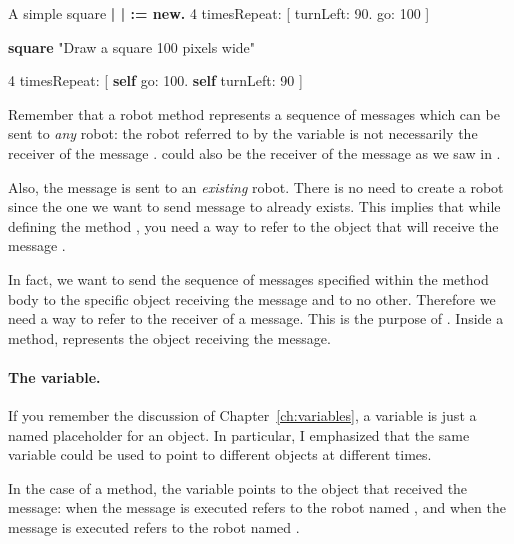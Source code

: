 \noindent
\begin{minipage}{7cm}
\begin{scriptwithtitle}{A simple square}\label{src:againSquare2}
\textbf{| \caro |
\caro := \Turtle new.}
4 timesRepeat: 
         [ \caro turnLeft: 90.
         \caro go: 100 ]
\end{scriptwithtitle}\end{minipage}
\hfill
\begin{minipage}{7cm}
\begin{method}\label{mth:square2}
\textbf{square}
   "Draw a square 100 pixels wide"
   
   4 timesRepeat: 
                [ \textbf{self} go: 100.
                \textbf{self} turnLeft: 90 ]
\end{method}
\end{minipage}


Remember that a robot method represents a sequence of messages which can be sent to \emph{any} robot: the robot referred to by the variable \caro is not necessarily the
receiver of the message . \daly could also be the receiver of the message  as we saw in . 

Also, the message  is sent to an \emph{existing}
robot. There is no need to create a robot since the one we want to send message to already exists. This implies that while defining the method , you need a way to refer to the object that will receive the message . 

In fact, we want to send the sequence of messages specified within the method body to the specific object receiving the message  and to no other. Therefore we need a way to refer to the receiver of a message.  This is the purpose of \self. Inside a method, \self represents the object receiving the  message.


\paragraph{The \self variable.}
If you remember the discussion of Chapter~\ref{ch:variables}, a variable is just a named placeholder for an object. In particular, I emphasized  that the same variable could be used to point to different objects at different times.

In the case of a method, the variable \self points to the object that received the message: when the message  is executed \self refers to the robot named \caro, and when the message  is executed \self refers to the robot named \daly. 

